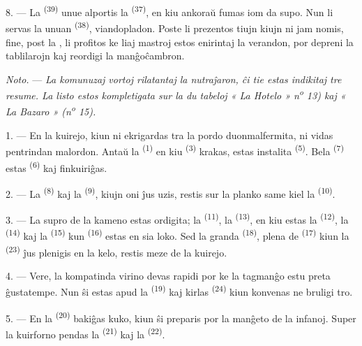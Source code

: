 8. --- La  \textsuperscript{(39)} unue alportis la
 \textsuperscript{(37)}, en kiu ankoraŭ fumas iom da supo. Nun
li servas la unuan  \textsuperscript{(38)}, viandopladon. Poste
li prezentos tiujn kiujn ni jam nomis, fine, post la , li
profitos ke liaj mastroj estos enirintaj la verandon, por depreni la
tablilarojn kaj reordigi la manĝoĉambron.

\textit{Noto.} --- \textit{La komunuzaj vortoj rilatantaj la nutraĵaron, ĉi
tie estas indikitaj tre resume. La listo estos kompletigata sur la du tabeloj
« La Hotelo » n\textsuperscript{o} 13) kaj « La Bazaro » (n\textsuperscript{o}
15).}

\VUsaut{4.6mm}
\VUsaut{3.0mm}

1. --- En la kuirejo, kiun ni ekrigardas tra la pordo duonmalfermita, ni vidas
pentrindan malordon. Antaŭ la  \textsuperscript{(1)} en kiu
 \textsuperscript{(3)} krakas, estas instalita
 \textsuperscript{(5)}. Bela 
\textsuperscript{(7)} estas  \textsuperscript{(6)}
kaj finkuiriĝas.

2. --- La  \textsuperscript{(8)} kaj la 
\textsuperscript{(9)}, kiujn oni ĵus uzis, restis sur la planko same kiel la
 \textsuperscript{(10)}.

3. --- La supro de la kameno estas ordigita; la 
\textsuperscript{(11)}, la  \textsuperscript{(13)}, en kiu
estas la  \textsuperscript{(12)}, la 
\textsuperscript{(14)} kaj la  \textsuperscript{(15)} kun
 \textsuperscript{(16)} estas en sia loko. Sed la granda
 \textsuperscript{(18)}, plena de 
\textsuperscript{(17)} kiun la  \textsuperscript{(23)} ĵus
plenigis en la kelo, restis meze de la kuirejo.

4. --- Vere, la kompatinda virino devas rapidi por ke la tagmanĝo estu preta
ĝustatempe. Nun ŝi estas apud la  \textsuperscript{(19)} kaj
kirlas  \textsuperscript{(24)} kiun konvenas ne bruligi tro.

5. --- En la  \textsuperscript{(20)} bakiĝas kuko, kiun ŝi
preparis por la manĝeto de la infanoj. Super la kuirforno pendas la
 \textsuperscript{(21)} kaj la 
\textsuperscript{(22)}.

